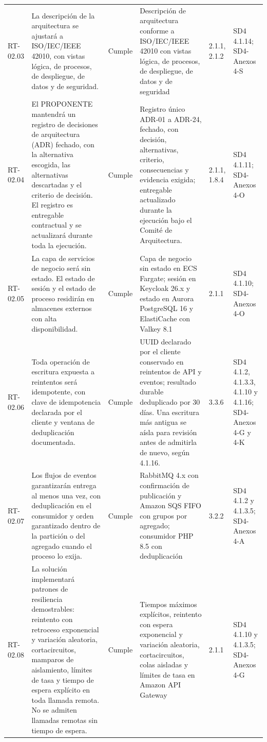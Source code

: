 \documentclass[carta,firma,final]{lafrox}
\begin{document}
\begin{landscape}
{\begin{longtable}{@{}F{0.070} F{0.255} F{0.075} F{0.280} F{0.090} F{0.230}@{}}
  RT-02.03 & La descripción de la arquitectura se ajustará a ISO/IEC/IEEE 42010, con vistas lógica, de procesos, de despliegue, de datos y de seguridad. & Cumple & Descripción de arquitectura conforme a ISO/IEC/IEEE 42010 con vistas lógica, de procesos, de despliegue, de datos y de seguridad & 2.1.1, 2.1.2 & SD4 4.1.14; SD4-Anexos 4-S \\
  RT-02.04 & El PROPONENTE mantendrá un registro de decisiones de arquitectura (ADR) fechado, con la alternativa escogida, las alternativas descartadas y el criterio de decisión. El registro es entregable contractual y se actualizará durante toda la ejecución. & Cumple & Registro único ADR-01 a ADR-24, fechado, con decisión, alternativas, criterio, consecuencias y evidencia exigida; entregable actualizado durante la ejecución bajo el Comité de Arquitectura. & 2.1.1, 1.8.4 & SD4 4.1.11; SD4-Anexos 4-O \\
  RT-02.05 & La capa de servicios de negocio será sin estado. El estado de sesión y el estado de proceso residirán en almacenes externos con alta disponibilidad. & Cumple & Capa de negocio sin estado en ECS Fargate; sesión en Keycloak 26.x y estado en Aurora PostgreSQL 16 y ElastiCache con Valkey 8.1 & 2.1.1 & SD4 4.1.10; SD4-Anexos 4-O \\
  RT-02.06 & Toda operación de escritura expuesta a reintentos será idempotente, con clave de idempotencia declarada por el cliente y ventana de deduplicación documentada. & Cumple & UUID declarado por el cliente conservado en reintentos de API y eventos; resultado durable deduplicado por 30 días. Una escritura más antigua se aísla para revisión antes de admitirla de nuevo, según 4.1.16. & 3.3.6 & SD4 4.1.2, 4.1.3.3, 4.1.10 y 4.1.16; SD4-Anexos 4-G y 4-K \\
  RT-02.07 & Los flujos de eventos garantizarán entrega al menos una vez, con deduplicación en el consumidor y orden garantizado dentro de la partición o del agregado cuando el proceso lo exija. & Cumple & RabbitMQ 4.x con confirmación de publicación y Amazon SQS FIFO con grupos por agregado; consumidor PHP 8.5 con deduplicación & 3.2.2 & SD4 4.1.2 y 4.1.3.5; SD4-Anexos 4-A \\
  RT-02.08 & La solución implementará patrones de resiliencia demostrables: reintento con retroceso exponencial y variación aleatoria, cortacircuitos, mamparos de aislamiento, límites de tasa y tiempo de espera explícito en toda llamada remota. No se admiten llamadas remotas sin tiempo de espera. & Cumple & Tiempos máximos explícitos, reintento con espera exponencial y variación aleatoria, cortacircuitos, colas aisladas y límites de tasa en Amazon API Gateway & 2.1.1 & SD4 4.1.10 y 4.1.3.5; SD4-Anexos 4-G \\

\end{longtable}}
\end{landscape}
\end{document}
